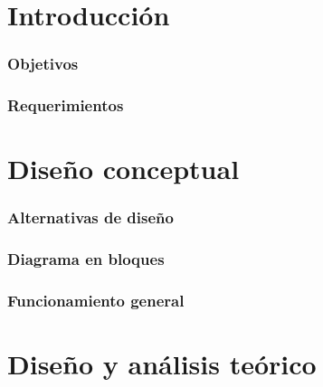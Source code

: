 \documentclass[10pt,a4paper]{article}
\begin{document}
		
	\setcounter{page}{1}

	\part{Introducción}\label{part:intro}

		\section{Objetivos}\label{sec:obj}
			

		\section{Requerimientos}\label{sec:req}
			

	\part{Diseño conceptual}\label{part:concept}

		\section{Alternativas de diseño}\label{sec:alt}
			

		\section{Diagrama en bloques}\label{sec:bloques}
			

		\section{Funcionamiento general}\label{sec:func_gral} %
			

	\part{Diseño y análisis teórico}\label{part:teo}
\end{document}
